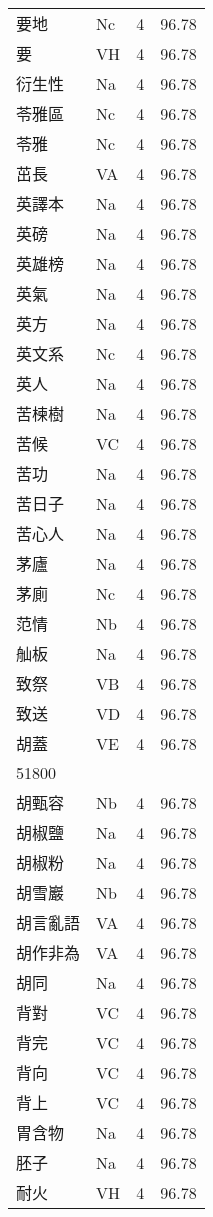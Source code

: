 \documentclass[twocolumn]{book}
\begin{document}
\begin{supertabular}{llrr}
要地 & Nc & 4 &  96.78\\
要 & VH & 4 &  96.78\\
衍生性 & Na & 4 &  96.78\\
苓雅區 & Nc & 4 &  96.78\\
苓雅 & Nc & 4 &  96.78\\
茁長 & VA & 4 &  96.78\\
英譯本 & Na & 4 &  96.78\\
英磅 & Na & 4 &  96.78\\
英雄榜 & Na & 4 &  96.78\\
英氣 & Na & 4 &  96.78\\
英方 & Na & 4 &  96.78\\
英文系 & Nc & 4 &  96.78\\
英人 & Na & 4 &  96.78\\
苦楝樹 & Na & 4 &  96.78\\
苦候 & VC & 4 &  96.78\\
苦功 & Na & 4 &  96.78\\
苦日子 & Na & 4 &  96.78\\
苦心人 & Na & 4 &  96.78\\
茅廬 & Na & 4 &  96.78\\
茅廁 & Nc & 4 &  96.78\\
范情 & Nb & 4 &  96.78\\
舢板 & Na & 4 &  96.78\\
致祭 & VB & 4 &  96.78\\
致送 & VD & 4 &  96.78\\
胡蓋 & VE & 4 &  96.78\\
51800\\
胡甄容 & Nb & 4 &  96.78\\
胡椒鹽 & Na & 4 &  96.78\\
胡椒粉 & Na & 4 &  96.78\\
胡雪巖 & Nb & 4 &  96.78\\
胡言亂語 & VA & 4 &  96.78\\
胡作非為 & VA & 4 &  96.78\\
胡同 & Na & 4 &  96.78\\
背對 & VC & 4 &  96.78\\
背完 & VC & 4 &  96.78\\
背向 & VC & 4 &  96.78\\
背上 & VC & 4 &  96.78\\
胃含物 & Na & 4 &  96.78\\
胚子 & Na & 4 &  96.78\\
耐火 & VH & 4 &  96.78\\

\end{supertabular}
\end{document}

